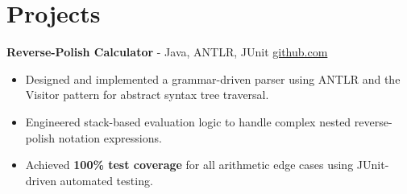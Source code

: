 \documentclass[11pt]{article}
\begin{document}

\vspace{-18.5pt}

\section*{Projects}

\textbf{Reverse-Polish Calculator}{ - Java, ANTLR, JUnit} \hfill \href{https://github.com/Monica20030707/ANTLR_ReversePolishCalculator}{github.com}
\vspace{-9pt}
\begin{itemize}
  \item Designed and implemented a grammar-driven parser using ANTLR and the Visitor pattern for abstract syntax tree traversal.
  \item Engineered stack-based evaluation logic to handle complex nested reverse-polish notation expressions.
  \item Achieved \textbf{100\% test coverage} for all arithmetic edge cases using JUnit-driven automated testing.
\end{itemize}
\end{document}
